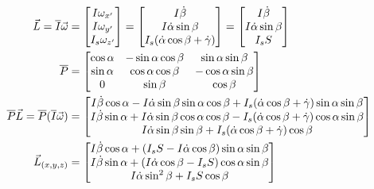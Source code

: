 \documentclass[10pt]{article}
\begin{document}
\begin{align}
    \vec{L} = \overline{I}\vec{\omega} &=
    \begin{bmatrix}
        I\omega_{x'} \\
        I\omega_{y'} \\
        I_s\omega_{z'}
    \end{bmatrix}
    =
    \begin{bmatrix}
        I\dot\beta \\
        I\dot\alpha\sin\beta \\
        I_s(\dot\alpha\cos\beta+\dot\gamma)
    \end{bmatrix}
    =
    \begin{bmatrix}
        I\dot\beta \\
        I\dot\alpha\sin\beta \\
        I_sS
    \end{bmatrix}
    \notag \\
    \overline{P} &= 
    \begin{bmatrix}
        \cos\alpha & -\sin\alpha\cos\beta & \sin\alpha\sin\beta \\
        \sin\alpha & \cos\alpha\cos\beta & -\cos\alpha\sin\beta \\
        0 & \sin\beta & \cos\beta
    \end{bmatrix}
     \\
   \overline{P}\vec{L}=\overline{P}(\overline{I}\vec{\omega}) &=
    \begin{bmatrix}
        I\dot\beta\cos\alpha-I\dot\alpha\sin\beta\sin\alpha\cos\beta 
            +I_s(\dot\alpha\cos\beta+\dot\gamma)\sin\alpha\sin\beta \\
        I\dot\beta\sin\alpha+I\dot\alpha\sin\beta\cos\alpha\cos\beta
            -I_s(\dot\alpha\cos\beta+\dot\gamma)\cos\alpha\sin\beta \\
        I\dot\alpha\sin\beta\sin\beta
            +I_s(\dot\alpha\cos\beta+\dot\gamma)\cos\beta
    \end{bmatrix}
    \notag \\
    \vec{L}_{(x,y,z)}&=
    \begin{bmatrix}
        I\dot\beta\cos\alpha+(I_sS
            -I\dot\alpha\cos\beta)\sin\alpha\sin\beta \\
        I\dot\beta\sin\alpha+(I\dot\alpha\cos\beta
            -I_sS)\cos\alpha\sin\beta \\
        I\dot\alpha\sin^2\beta +I_sS\cos\beta
    \end{bmatrix}
    \\

\end{align}
\end{document}
